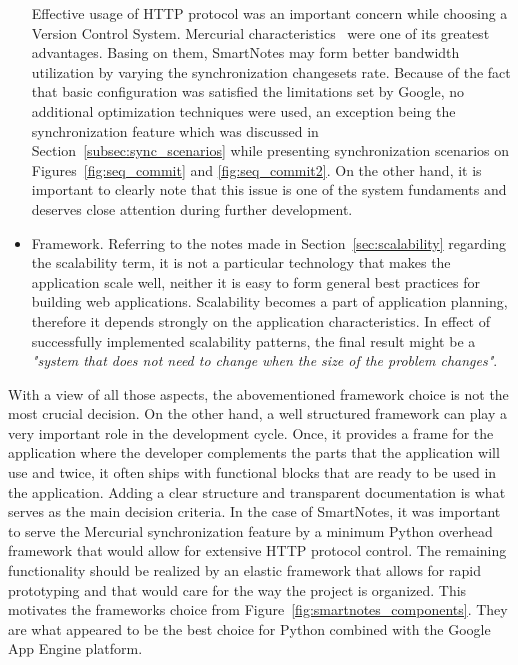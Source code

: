 \begin{itemize}
{Effective usage of HTTP protocol was an important concern while choosing a Version Control System. Mercurial characteristics~\cite{google_hg_git_compare} were one of its greatest advantages. Basing on them, SmartNotes may form better bandwidth utilization by varying the synchronization changesets rate. Because of the fact that basic configuration was satisfied the limitations set by Google, no additional optimization techniques were used, an exception being the synchronization feature which was discussed in Section~\ref{subsec:sync_scenarios} while presenting synchronization scenarios on Figures~\ref{fig:seq_commit} and \ref{fig:seq_commit2}. On the other hand, it is important to clearly note that this issue is one of the system fundaments and deserves close attention during further development.}
\item{Framework. Referring to the notes made in Section~\ref{sec:scalability} regarding the scalability term, it is not a particular technology that makes the application scale well, neither it is easy to form general best practices for building web applications. Scalability becomes a part of application planning, therefore it depends strongly on the application characteristics. In effect of successfully implemented scalability patterns, the final result might be a \textit{"system that does not need to change when the size of the problem changes"}\cite{mike_malone_quote}.}  
\end{itemize}
 
With a view of all those aspects, the abovementioned framework choice is not the most crucial decision. On the other hand, a well structured framework can play a very important role in the development cycle. Once, it provides a frame for the application where the developer complements the parts that the application will use and twice, it often ships with functional blocks that are ready to be used in the application. Adding a clear structure and transparent documentation is what serves as the main decision criteria. In the case of SmartNotes, it was important to serve the Mercurial synchronization feature by a minimum Python overhead framework that would allow for extensive HTTP protocol control. The remaining functionality should be realized by an elastic framework that allows for rapid prototyping and that would care for the way the project is organized. This motivates the frameworks choice from Figure~\ref{fig:smartnotes_components}. They are what appeared to be the best choice for Python combined with the Google App Engine platform.   
 
